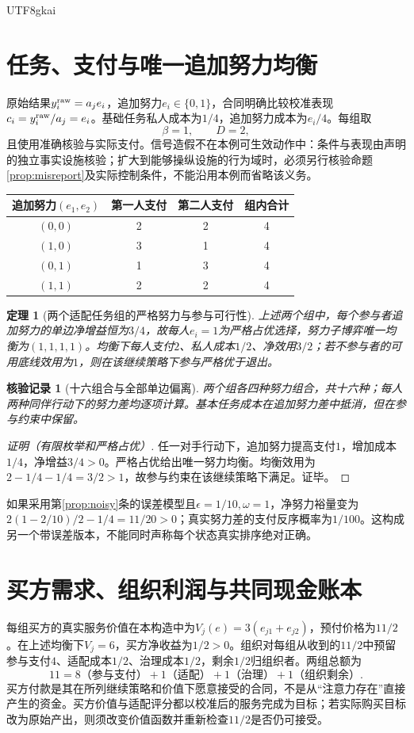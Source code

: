 \documentclass[12pt,a4paper,openany]{report}
\newtheorem{theorem}{定理}[chapter]
\newtheorem{Certificate}{核验记录}[chapter]
\begin{document}
\begin{CJK*}{UTF8}{gkai}
\section{任务、支付与唯一追加努力均衡}
原始结果$y_i^{\rm raw}=a_je_i$，追加努力$e_i\in\{0,1\}$，合同明确比较校准表现$c_i=y_i^{\rm raw}/a_j=e_i$。基础任务私人成本为$1/4$，追加努力成本为$e_i/4$。每组取
\[
 \beta=1,\qquad D=2,
\]
且使用准确核验与实际支付。信号造假不在本例可生效动作中：条件与表现由声明的独立事实设施核验；扩大到能够操纵设施的行为域时，必须另行核验命题\ref{prop:misreport}及实际控制条件，不能沿用本例而省略该义务。
\begin{center}
\begin{tabular}{cccc}
\toprule 追加努力$(e_1,e_2)$ & 第一人支付 & 第二人支付 & 组内合计\\\midrule
$(0,0)$ & 2 & 2 & 4\\
$(1,0)$ & 3 & 1 & 4\\
$(0,1)$ & 1 & 3 & 4\\
$(1,1)$ & 2 & 2 & 4\\\bottomrule
\end{tabular}
\end{center}
\begin{theorem}[两个适配任务组的严格努力与参与可行性]
\label{thm:example-effort}
上述两个组中，每个参与者追加努力的单边净增益恒为$3/4$，故每人$e_i=1$为严格占优选择，努力子博弈唯一均衡为$(1,1,1,1)$。均衡下每人支付$2$、私人成本$1/2$、净效用$3/2$；若不参与者的可用底线效用为$1$，则在该继续策略下参与严格优于退出。
\end{theorem}
\begin{Certificate}[十六组合与全部单边偏离]
两个组各四种努力组合，共十六种；每人两种同伴行动下的努力差均逐项计算。基本任务成本在追加努力差中抵消，但在参与约束中保留。
\end{Certificate}
\begin{proof}[证明（有限枚举和严格占优）]
任一对手行动下，追加努力提高支付$1$，增加成本$1/4$，净增益$3/4>0$。严格占优给出唯一努力均衡。均衡效用为$2-1/4-1/4=3/2>1$，故参与约束在该继续策略下满足。证毕。
\end{proof}
如果采用第\ref{prop:noisy}条的误差模型且$\epsilon=1/10,\omega=1$，净努力裕量变为$2(1-2/10)/2-1/4=11/20>0$；真实努力差的支付反序概率为$1/100$。这构成另一个带误差版本，不能同时声称每个状态真实排序绝对正确。

\section{买方需求、组织利润与共同现金账本}
每组买方的真实服务价值在本构造中为$V_j(e)=3(e_{j1}+e_{j2})$，预付价格为$11/2$。在上述均衡下$V_j=6$，买方净收益为$1/2>0$。组织对每组从收到的$11/2$中预留参与支付$4$、适配成本$1/2$、治理成本$1/2$，剩余$1/2$归组织者。两组总额为
\begin{equation}\label{eq:example-budget}
 11=8\text{（参与支付）}+1\text{（适配）}
      +1\text{（治理）}+1\text{（组织剩余）}.
\end{equation}
买方付款是其在所列继续策略和价值下愿意接受的合同，不是从“注意力存在”直接产生的资金。买方价值与适配评分都以校准后的服务完成为目标；若实际购买目标改为原始产出，则须改变价值函数并重新检查$11/2$是否仍可接受。


\end{CJK*}
\end{document}
